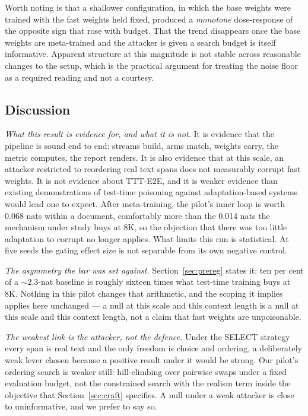 Worth noting is that a shallower configuration, in which the base weights were
trained with the fast weights held fixed, produced a \emph{monotone}
dose-response of the opposite sign that rose with budget. That the trend
disappears once the base weights are meta-trained and the attacker is given a
search budget is itself informative. Apparent structure at this magnitude is not
stable across reasonable changes to the setup, which is the practical argument
for treating the noise floor as a required reading and not a courtesy.

\subsection{Discussion}
\label{sec:discussion}

\textit{What this result is evidence for, and what it is not.} It is evidence
that the pipeline is sound end to end: streams build, arms match, weights carry,
the metric computes, the report renders. It is also evidence that at this scale,
an attacker restricted to reordering real text spans does not measurably corrupt
fast weights. It is not evidence about TTT-E2E, and it is weaker evidence than
existing demonstrations of test-time poisoning against adaptation-based
systems~\cite{cong2024ttp,su2025realistic,hoang2024rip} would lead one to expect.
After meta-training, the pilot's inner loop is worth 0.068 nats within a
document, comfortably more than the 0.014 nats the mechanism under study buys at
8K, so the objection that there was too little adaptation to corrupt no longer
applies. What limits this run is statistical. At five seeds the gating effect
size is not separable from its own negative control.

\textit{The asymmetry the bar was set against.} Section~\ref{sec:prereg} states
it: ten per cent of a ${\sim}2.3$-nat baseline is roughly sixteen times what
test-time training buys at 8K. Nothing in this pilot changes that arithmetic, and
the scoping it implies applies here unchanged --- a null at this scale and this
context length is a null at this scale and this context length, not a claim that
fast weights are unpoisonable.

\textit{The weakest link is the attacker, not the defence.} Under the SELECT
strategy every span is real text and the only freedom is choice and ordering, a
deliberately weak lever chosen because a positive result under it would be
strong. Our pilot's ordering search is weaker still: hill-climbing over pairwise
swaps under a fixed evaluation budget, not the constrained search with the
realism term inside the objective that Section~\ref{sec:craft} specifies. A null
under a weak attacker is close to uninformative, and we prefer to say so.

